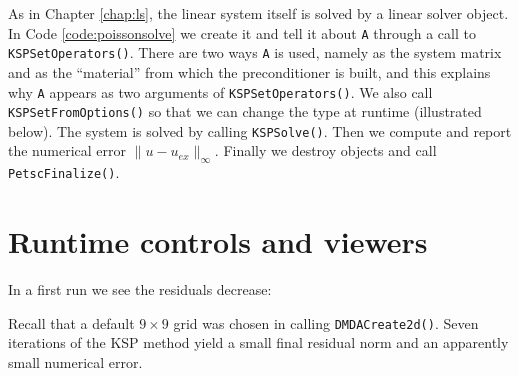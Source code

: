 As in Chapter \ref{chap:ls}, the linear system itself is solved by a \pKSP linear solver object.  In Code \ref{code:poissonsolve} we create it and tell it about \pMat \texttt{A} through a call to \texttt{KSPSetOperators()}.  There are two ways \texttt{A} is used, namely as the system matrix and as the ``material'' from which the preconditioner is built, and this explains why \texttt{A} appears as two arguments of \texttt{KSPSetOperators()}.  We also call \texttt{KSPSetFromOptions()} so that we can change the \pKSP type at runtime (illustrated below).  The system is solved by calling \texttt{KSPSolve()}.  Then we compute and report the numerical error $\|u-u_{ex}\|_\infty$.  Finally we destroy objects and call \texttt{PetscFinalize()}.



\section{Runtime controls and viewers}

In a first run we see the residuals decrease:
Recall that a default $9$ grid was chosen in calling \texttt{DMDACreate2d()}.  Seven iterations of the KSP method yield a small final residual norm and an apparently small numerical error.

